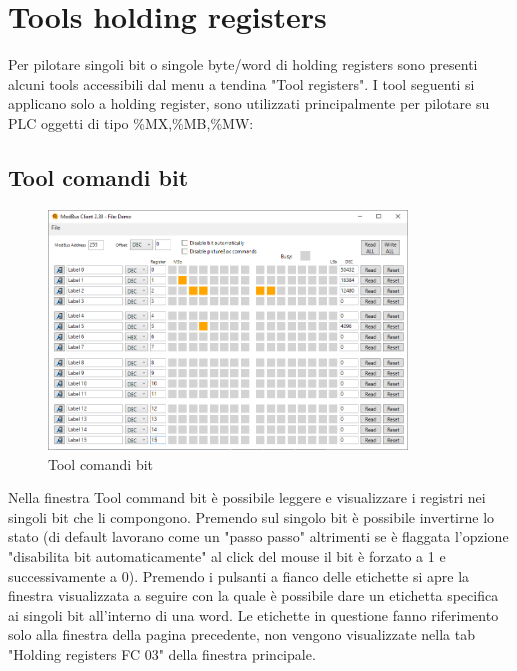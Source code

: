 
\chapter{Tools holding registers}

Per pilotare singoli bit o singole byte/word di holding registers
sono presenti alcuni tools 
accessibili dal menu a tendina
"Tool registers". I tool seguenti si applicano solo a holding register, 
sono utilizzati principalmente per
pilotare su PLC oggetti di tipo \%MX,\%MB,\%MW:

\section{Tool comandi bit}

\begin{figure}[H]
\centering
\includegraphics[width=0.85\textwidth]{../Img/Tool_Command_Bit.PNG}
\caption{Tool comandi bit}
\label{holding_main_win}
\end{figure}

Nella finestra Tool command bit è possibile leggere e visualizzare i registri nei singoli bit
che li compongono. Premendo sul singolo bit è possibile invertirne lo stato
(di default lavorano come un "passo passo" altrimenti 
se è flaggata l'opzione "disabilita bit automaticamente" al click del mouse il bit è
forzato a 1 e successivamente a 0).
\newpage
Premendo i pulsanti a fianco delle etichette si apre la finestra visualizzata a seguire con
la quale è possibile dare un etichetta specifica ai singoli bit
all'interno di una word. Le etichette in questione
fanno riferimento solo alla finestra della pagina precedente, non vengono visualizzate nella tab 
"Holding registers FC 03" della finestra principale. 

